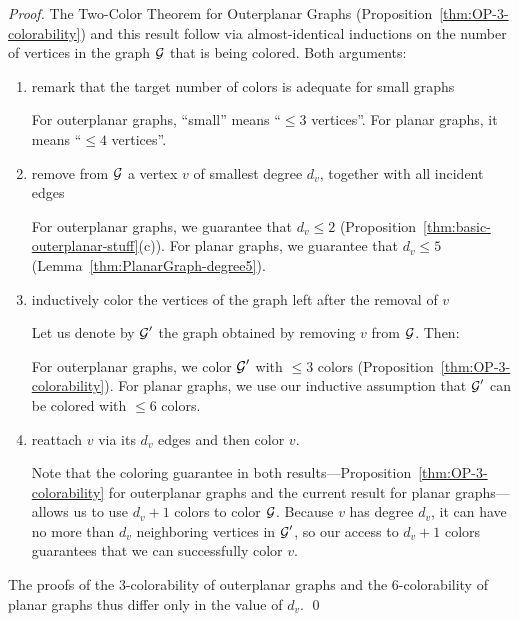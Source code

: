 \begin{proof}
The Two-Color Theorem for Outerplanar Graphs (Proposition~\ref{thm:OP-3-colorability}) and this result follow via almost-identical inductions on the number of vertices in the graph $\mbox{$\cal G$}$ that is being colored.  Both arguments:
\begin{enumerate}
\item
remark that the target number of colors is adequate for small graphs

\smallskip

For outerplanar graphs, ``small'' means ``$\leq 3$ vertices''.  For planar graphs, it means ``$\leq 4$ vertices''.

\medskip\item
remove from $\mbox{$\cal G$}$ a vertex $v$ of smallest degree $d_v$, together with all incident edges

\smallskip

For outerplanar graphs, we guarantee that $d_v \leq 2$ 
(Proposition~\ref{thm:basic-outerplanar-stuff}(c)).  For planar graphs, we guarantee that $d_v \leq 5$ (Lemma~\ref{thm:PlanarGraph-degree5}).

\medskip\item
inductively color the vertices of the graph left after the removal of $v$

\smallskip

Let us denote by $\mbox{$\cal G$}'$ the graph obtained by removing $v$ from $\mbox{$\cal G$}$.  Then: 

For outerplanar graphs, we color $\mbox{$\cal G$}'$ with $\leq 3$ colors (Proposition~\ref{thm:OP-3-colorability}).  For planar graphs, we use our inductive assumption that $\mbox{$\cal G$}'$ can be colored with $\leq 6$ colors. 

\medskip\item
reattach $v$ via its $d_v$ edges and then color $v$.

\smallskip

Note that the coloring guarantee in both results---Proposition~\ref{thm:OP-3-colorability} for outerplanar graphs and the current result for planar graphs---allows us to use $d_v +1$ colors to color $\mbox{$\cal G$}$.  Because $v$ has degree $d_v$, it can have no more than $d_v$ neighboring vertices in $\mbox{$\cal G$}'$, so our access to $d_v +1$ colors guarantees that we can successfully color $v$.
\end{enumerate}
The proofs of the $3$-colorability of outerplanar graphs and the $6$-colorability of planar graphs thus differ only in the value of $d_v$.  \qed
\end{proof}


